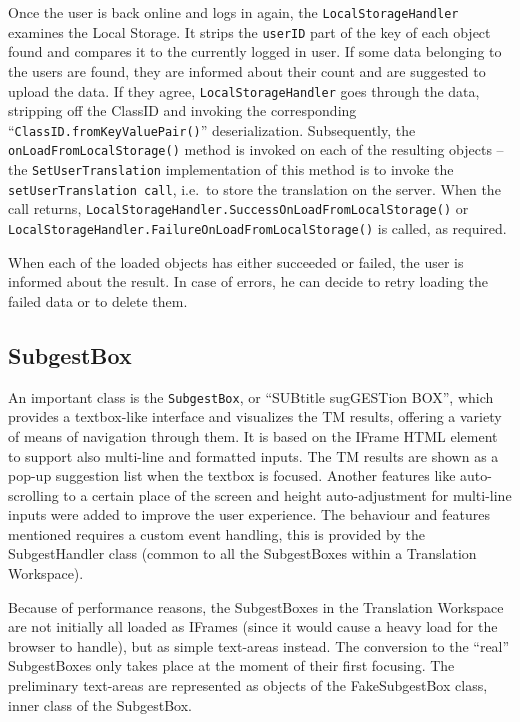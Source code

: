 Once the user is back online and logs in again, the {\tt LocalStorageHandler} examines the Local Storage. It strips the {\tt userID} part of the key of each object found and compares it to the currently logged in user. If some data belonging to the users are found, they are informed about their count and are suggested to upload the data. If they agree, {\tt LocalStorageHandler} goes through the data, stripping off the ClassID and invoking the corresponding ``{\tt ClassID.fromKeyValuePair()}'' deserialization. Subsequently, the {\tt onLoadFromLocalStorage()} method is invoked on each of the resulting objects -- the {\tt SetUserTranslation} implementation of this method is to invoke the {\tt setUserTranslation call}, i.e.\ to store the translation on the server. When the call returns, {\tt LocalStorageHandler.SuccessOnLoadFromLocalStorage()} or {\tt LocalStorageHandler.FailureOnLoadFromLocalStorage()} is called, as required.

When each of the loaded objects has either succeeded or failed, the user is informed about the result. In case of errors, he can decide to retry loading the failed data or to delete them.

\subsection{SubgestBox}

An important class is the {\tt SubgestBox}, or ``SUBtitle sugGESTion BOX'', which provides a textbox-like interface and visualizes the TM results, offering a variety of means of navigation through them. It is based on the IFrame HTML element to support also multi-line and formatted inputs. The TM results are shown as a pop-up suggestion list when the textbox is focused. Another features like auto-scrolling to a certain place of the screen and height auto-adjustment for multi-line inputs were added to improve the user experience. The behaviour and features mentioned requires a custom event handling, this is provided by the SubgestHandler class (common to all the SubgestBoxes within a Translation Workspace).

Because of performance reasons, the SubgestBoxes in the Translation Workspace are not initially all loaded as IFrames (since it would cause a heavy load for the browser to handle), but as simple text-areas instead. The conversion to the ``real'' SubgestBoxes only takes place at the moment of their first focusing. The preliminary text-areas are represented as objects of the FakeSubgestBox class, inner class of the SubgestBox.

